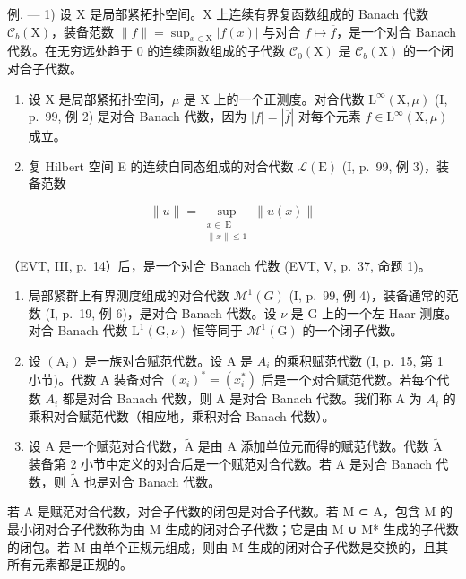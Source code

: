 例. --- 1) 设 X 是局部紧拓扑空间。X 上连续有界复函数组成的 Banach 代数 \(\mathcal{C}_{b}(\mathrm{X})\)，装备范数 \(\|f\| = \sup_{x\in\mathrm{X}}|f(x)|\) 与对合 \(f\mapsto\overline{f}\)，是一个对合 Banach 代数。在无穷远处趋于 0 的连续函数组成的子代数 \(\mathcal{C}_{0}(\mathrm{X})\) 是 \(\mathcal{C}_{b}(\mathrm{X})\) 的一个闭对合子代数。

\begin{enumerate}
\def\labelenumi{\arabic{enumi})}
\setcounter{enumi}{1}
\item
  设 X 是局部紧拓扑空间，\(\mu\) 是 X 上的一个正测度。对合代数 \(\mathrm{L}^{\infty}(\mathrm{X},\mu)\) (I, p.~99, 例 2) 是对合 Banach 代数，因为 \(|f| = |\overline{f}|\) 对每个元素 \(f \in \mathrm{L}^{\infty}(\mathrm{X},\mu)\) 成立。
\item
  复 Hilbert 空间 E 的连续自同态组成的对合代数 \(\mathcal{L}(\mathrm{E})\) (I, p.~99, 例 3)，装备范数
\end{enumerate}

\[
\| u\| = \sup_{\substack{x\in \operatorname{E}\\ \| x\| \leqslant 1}}\| u(x)\|
\]

（EVT, III, p.~14）后，是一个对合 Banach 代数 (EVT, V, p.~37, 命题 1)。

\begin{enumerate}
\def\labelenumi{\arabic{enumi})}
\setcounter{enumi}{3}
\item
  局部紧群上有界测度组成的对合代数 \(\mathcal{M}^{1}(G)\) (I, p.~99, 例 4)，装备通常的范数 (I, p.~19, 例 6)，是对合 Banach 代数。设 \(\nu\) 是 G 上的一个左 Haar 测度。对合 Banach 代数 \(\mathrm{L}^{1}(\mathrm{G},\nu)\) 恒等同于 \(\mathcal{M}^{1}(\mathrm{G})\) 的一个闭子代数。
\item
  设 \((\mathrm{A}_{i})\) 是一族对合赋范代数。设 A 是 \(A_{i}\) 的乘积赋范代数 (I, p.~15, 第 1 小节)。代数 A 装备对合 \((x_{i})^{*} = (x_{i}^{*})\) 后是一个对合赋范代数。若每个代数 \(A_{i}\) 都是对合 Banach 代数，则 A 是对合 Banach 代数。我们称 A 为 \(A_{i}\) 的乘积对合赋范代数（相应地，乘积对合 Banach 代数）。
\item
  设 A 是一个赋范对合代数，\(\widetilde{\mathrm{A}}\) 是由 A 添加单位元而得的赋范代数。代数 \(\widetilde{\mathrm{A}}\) 装备第 2 小节中定义的对合后是一个赋范对合代数。若 A 是对合 Banach 代数，则 \(\widetilde{\mathrm{A}}\) 也是对合 Banach 代数。
\end{enumerate}

若 A 是赋范对合代数，对合子代数的闭包是对合子代数。若 M ⊂ A，包含 M 的最小闭对合子代数称为由 M 生成的闭对合子代数；它是由 M ∪ M* 生成的子代数的闭包。若 M 由单个正规元组成，则由 M 生成的闭对合子代数是交换的，且其所有元素都是正规的。

